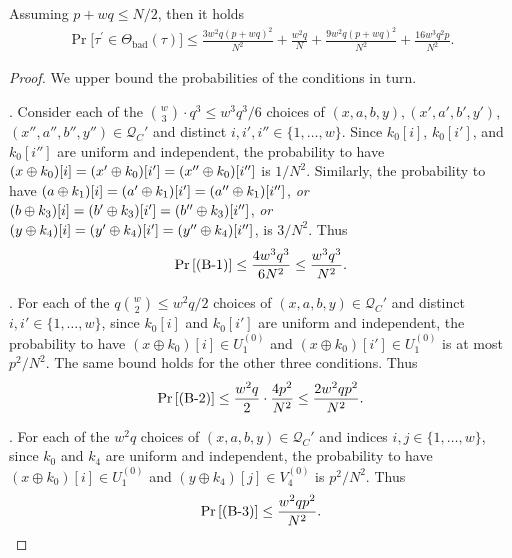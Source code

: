 \begin{lemma}
	\label{lemma:bad-tau-4-rounds}
	
	Assuming $p+wq\leq N/2$, then it holds
	\begin{align}
	{\Pr}\big[\tau^{\prime} \in \Theta_{\mathrm{bad}}(\tau)\big] \leq \frac{3w^{2} q \left(p+w q\right)^{2}}{N^{2}} + \frac{w^{2} q}{N} + \frac{9w^2 q (p+w q)^{2}}{N^2}+ \frac{16w^3q^2p}{N^2}.
	\label{eq:bound-bad-tau-4-rounds}
	\end{align}
\end{lemma}
\begin{proof}
We upper bound the probabilities of the conditions in turn.



\arrangespace

\noindent \textsc{\bone}.
%
Consider each of the ${w\choose 3}\cdot q^3\leq w^3q^3/6$ choices of $(x,a,b,y),(x',a',b',y')$, $(x'',a'',b'',y'')\in \mathcal{Q}_{C}'$ and distinct $i, i', i'' \in \{1, \ldots, w\}$. Since $k_0[i]$, $k_0[i']$, and $k_0[i'']$ are uniform and independent, the probability to have $(x\oplus k_0)[i]=(x'\oplus k_0)[i']=(x''\oplus k_0)[i'']$ is $1/N^2$. Similarly, the probability to have $(a\oplus k_1)[i]=(a'\oplus k_1)[i']=(a''\oplus k_1)[i'']$, {\it or} $(b\oplus k_3)[i]=(b'\oplus k_3)[i']=(b''\oplus k_3)[i'']$, {\it or} $(y\oplus k_4)[i]=(y'\oplus k_4)[i']=(y''\oplus k_4)[i'']$, is $3/N^2$. Thus
%
$$
\operatorname{Pr}\left[\text{(B-1)}\right] \leq \frac{4w^3q^3}{6N^2}\leq \frac{w^3q^3}{N^2}.
$$
%


		
\arrangespace

\noindent \textsc{\btwo}.
%
For each of the $q{w\choose 2}\leq w^2q/2$ choices of $(x,a,b, y) \in \mathcal{Q}_{C}'$ and distinct $i, i' \in \{1, \ldots, w\}$, since $k_0[i]$ and $k_0[i']$ are uniform and independent, the probability to have $(x \oplus k_{0})[i]\in U_1^{(0)}$ and $(x \oplus k_0)[i']\in U_1^{(0)}$ is at most $p^2/N^2$. The same bound holds for the other three conditions. Thus
%
$$
\operatorname{Pr}\left[\text{(B-2)}\right] \leq \frac{w^{2} q}{2}\cdot\frac{4p^2}{N^2}\leq\frac{2w^{2} q p^2}{N^{2}}.
$$
%




\noindent \textsc{\bthree}.
%
For each of the $w^2q$ choices of $(x,a,b,y)\in\mathcal{Q}_{C}'$ and indices $i, j \in \{1, \ldots, w\}$, since $k_{0}$ and $k_{4}$ are uniform and independent, the probability to have $(x \oplus k_{0})[i]\in U_1^{(0)}$ and $(y \oplus k_{4})[j]\in V_4^{(0)}$ is $p^2/N^2$. Thus
%
$$
\operatorname{Pr}\left[\text{(B-3)}\right] \leq \frac{w^{2} q p^2}{N^{2}}.
$$
%




\end{proof}
